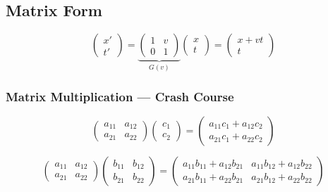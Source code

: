 \subsection*{Matrix Form}

\begin{equation*}
  \begin{pmatrix} x' \\ t' \end{pmatrix}
  = \underbrace{\begin{pmatrix} 1 & v \\ 0 & 1 \end{pmatrix}}_{G(v)}
  \begin{pmatrix} x \\ t \end{pmatrix}
  = \begin{pmatrix} x + vt \\ t \end{pmatrix}
\end{equation*}

\subsubsection*{Matrix Multiplication --- Crash Course}

\begin{equation*}
  \begin{pmatrix} a_{11} & a_{12} \\ a_{21} & a_{22} \end{pmatrix}
  \begin{pmatrix} c_1 \\ c_2 \end{pmatrix}
  = \begin{pmatrix} a_{11}c_1 + a_{12}c_2 \\ a_{21}c_1 + a_{22}c_2 \end{pmatrix}
\end{equation*}

\begin{equation*}
  \begin{pmatrix} a_{11} & a_{12} \\ a_{21} & a_{22} \end{pmatrix}
  \begin{pmatrix} b_{11} & b_{12} \\ b_{21} & b_{22} \end{pmatrix}
  = \begin{pmatrix}
      a_{11}b_{11} + a_{12}b_{21} & a_{11}b_{12} + a_{12}b_{22} \\
      a_{21}b_{11} + a_{22}b_{21} & a_{21}b_{12} + a_{22}b_{22}
    \end{pmatrix}
\end{equation*}

